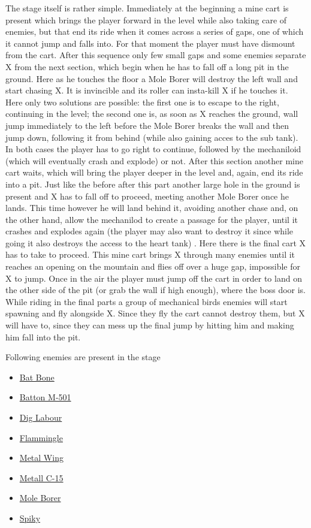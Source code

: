 The stage itself is rather simple. Immediately at the beginning a mine cart is present which brings the player forward in the level while also taking care of enemies, but that end its ride when it comes across a series of gaps, one of which it cannot jump and falls into. For that moment the player must have dismount from the cart. After this sequence only few small gaps and some enemies separate X from the next section, which begin when he has to fall off a long pit in the ground. Here as he touches the floor a Mole Borer will destroy the left wall and start chasing X. It is invincible and its roller can insta-kill X if he touches it. Here only two solutions are possible: the first one is to escape to the right, continuing in the level; the second one is, as soon as X reaches the ground, wall jump immediately to the left before the Mole Borer breaks the wall and then jump down, following it from behind (while also gaining acces to the sub tank). In both cases the player has to go right to continue, followed by the mechaniloid (which will eventually crash and explode) or not. After this section another mine cart waits, which will bring the player deeper in the level and, again, end its ride into a pit. Just like the before after this part another large hole in the ground is present and X has to fall off to proceed, meeting another Mole Borer once he lands. This time however he will land behind it, avoiding another chase and, on the other hand, allow the mechanilod to create a passage for the player, until it crashes and explodes again (the player may also want to destroy it since while going it also destroys the access to the heart tank) . Here there is the final cart X has to take to proceed. This mine cart brings X through many enemies until it reaches an opening on the mountain and flies off over a huge gap, impossible for X to jump. Once in the air the player must jump off the cart in order to land on the other side of the pit (or grab the wall if high enough), where the boss door is. While riding in the final parts a group of mechanical birds enemies will start spawning and fly alongside X. Since they fly the cart cannot destroy them, but X will have to, since they can mess up the final jump by hitting him and making him fall into the pit.

Following enemies are present in the stage\cite{wiki:Gallery}
\begin{itemize}
	\item \hyperlink{enem:Bat_Bone}{Bat Bone} 
	\item \hyperlink{enem:Batton_M-501}{Batton M-501} 
	\item \hyperlink{enem:Dig_Labour}{Dig Labour} 
	\item \hyperlink{enem:Flammingle}{Flammingle} 
	\item \hyperlink{enem:Metal_Wing}{Metal Wing} 
	\item \hyperlink{enem:Metall_C-15}{Metall C-15} 
	\item \hyperlink{miniboss:Mole Borer}{Mole Borer}
	\item \hyperlink{enem:Spiky}{Spiky}
\end{itemize}

